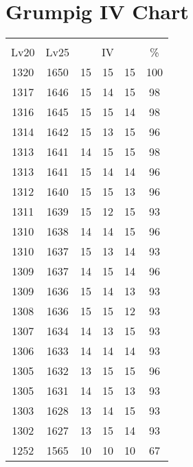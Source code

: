 \documentclass{article}%
\begin{document}
%
\normalsize%
\section{Grumpig IV Chart}%
\label{sec:Grumpig IV Chart}%
\renewcommand{\arraystretch}{1.5}%
\begin{tabular}{|c|c|c|c|c|c|}%
\hline%
\multicolumn{6}{|c|}{\textcolor{white}{ 
\linebreak{Grumpig}
}%
\cellcolor{black}}\\%
\multicolumn{1}{|c}{Lv20}&\multicolumn{1}{c|}{Lv25}&\multicolumn{3}{c|}{IV}&\multicolumn{1}{|c|}{\%}\\%
\hline%
\rowcolor{color100}%
1320&1650&15&15&15&100\\%
\hline%
\rowcolor{color98}%
1317&1646&15&14&15&98\\%
\hline%
\rowcolor{color98}%
1316&1645&15&15&14&98\\%
\hline%
\rowcolor{color96}%
1314&1642&15&13&15&96\\%
\hline%
\rowcolor{color98}%
1313&1641&14&15&15&98\\%
\hline%
\rowcolor{color96}%
1313&1641&15&14&14&96\\%
\hline%
\rowcolor{color96}%
1312&1640&15&15&13&96\\%
\hline%
\rowcolor{color93}%
1311&1639&15&12&15&93\\%
\hline%
\rowcolor{color96}%
1310&1638&14&14&15&96\\%
\hline%
\rowcolor{color93}%
1310&1637&15&13&14&93\\%
\hline%
\rowcolor{color96}%
1309&1637&14&15&14&96\\%
\hline%
\rowcolor{color93}%
1309&1636&15&14&13&93\\%
\hline%
\rowcolor{color93}%
1308&1636&15&15&12&93\\%
\hline%
\rowcolor{color93}%
1307&1634&14&13&15&93\\%
\hline%
\rowcolor{color93}%
1306&1633&14&14&14&93\\%
\hline%
\rowcolor{color96}%
1305&1632&13&15&15&96\\%
\hline%
\rowcolor{color93}%
1305&1631&14&15&13&93\\%
\hline%
\rowcolor{color93}%
1303&1628&13&14&15&93\\%
\hline%
\rowcolor{color93}%
1302&1627&13&15&14&93\\%
\hline%
\rowcolor{color91}%
1252&1565&10&10&10&67\\%
\end{tabular}

%
\end{document}
